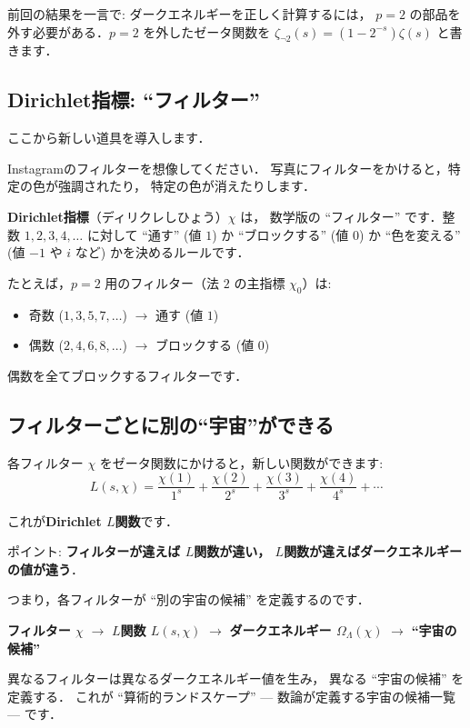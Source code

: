 \documentclass[11pt,a4paper]{article}
\begin{document}
前回の結果を一言で: ダークエネルギーを正しく計算するには，
$p=2$ の部品を外す必要がある．$p=2$ を外したゼータ関数を
$\zeta_{\neg 2}(s) = (1 - 2^{-s})\zeta(s)$ と書きます．

\subsection{Dirichlet指標: ``フィルター''}

ここから新しい道具を導入します．

Instagramのフィルターを想像してください．
写真にフィルターをかけると，特定の色が強調されたり，
特定の色が消えたりします．

\textbf{Dirichlet指標}（ディリクレしひょう）$\chi$ は，
数学版の ``フィルター'' です．整数 $1, 2, 3, 4, \ldots$ に対して
``通す'' (値 $1$) か ``ブロックする'' (値 $0$) か
``色を変える'' (値 $-1$ や $i$ など) かを決めるルールです．

たとえば，$p=2$ 用のフィルター（法 $2$ の主指標 $\chi_0$）は:
\begin{itemize}
\item 奇数 ($1, 3, 5, 7, \ldots$) $\to$ 通す (値 $1$)
\item 偶数 ($2, 4, 6, 8, \ldots$) $\to$ ブロックする (値 $0$)
\end{itemize}

偶数を全てブロックするフィルターです．

\subsection{フィルターごとに別の``宇宙''ができる}

各フィルター $\chi$ をゼータ関数にかけると，新しい関数ができます:
\begin{equation*}
L(s, \chi) = \frac{\chi(1)}{1^s} + \frac{\chi(2)}{2^s}
+ \frac{\chi(3)}{3^s} + \frac{\chi(4)}{4^s} + \cdots
\end{equation*}

これが\textbf{Dirichlet $L$関数}です．

ポイント: \textbf{フィルターが違えば $L$関数が違い，
$L$関数が違えばダークエネルギーの値が違う}．

つまり，各フィルターが ``別の宇宙の候補'' を定義するのです．

\begin{tcolorbox}[colback=blue!5,colframe=blue!50!black,title=キーポイント]
\textbf{フィルター $\chi$} $\longrightarrow$
\textbf{$L$関数 $L(s,\chi)$} $\longrightarrow$
\textbf{ダークエネルギー $\Omega_\Lambda(\chi)$} $\longrightarrow$
\textbf{``宇宙の候補''}

異なるフィルターは異なるダークエネルギー値を生み，
異なる ``宇宙の候補'' を定義する．
これが ``算術的ランドスケープ'' --- 数論が定義する宇宙の候補一覧 --- です．
\end{tcolorbox}
\end{document}
